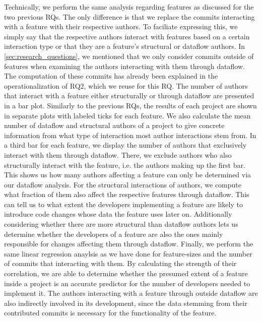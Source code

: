 Technically, we perform the same analysis regarding features as discussed for the two previous RQs.
The only difference is that we replace the commits interacting with a feature with their respective authors.
To faciliate expressing this, we simply say that the respective authors interact with features based on a certain interaction type or that they are a feature's structural or dataflow authors.
In \autoref{sec:research_questions}, we mentioned that we only consider commits outside of features when examining the authors interacting with them through dataflow.
The computation of these commits has already been explained in the operationalization of RQ2, which we reuse for this RQ.
The number of authors that interact with a feature either structurally or through dataflow are presented in a bar plot.
Similarly to the previous RQs, the results of each project are shown in separate plots with labeled ticks for each feature.
We also calculate the mean number of dataflow and structural authors of a project to give concrete information from what type of interaction most author interactions stem from.
In a third bar for each feature, we display the number of authors that exclusively interact with them through dataflow.
There, we exclude authors who also structurally interact with the feature, i.e. the authors making up the first bar.
This shows us how many authors affecting a feature can only be determined via our dataflow analysis.
For the structural interactions of authors, we compute what fraction of them also affect the respective features through dataflow.
This can tell us to what extent the developers implementing a feature are likely to introduce code changes whose data the feature uses later on.
Additionally considering whether there are more structural than dataflow authors lets us determine whether the developers of a feature are also the ones mainly responsible for changes affecting them through dataflow.
Finally, we perform the same linear regression anaylsis as we have done for feature-sizes and the number of commits that interacting with them.
By calculating the strength of their correlation, we are able to determine whether the presumed extent of a feature inside a project is an accurate predictor for the number of developers needed to implement it.
The authors interacting with a feature through outside dataflow are also indirectly involved in its development, since the data stemming from their contributed commits is necessary for the functionality of the feature.
